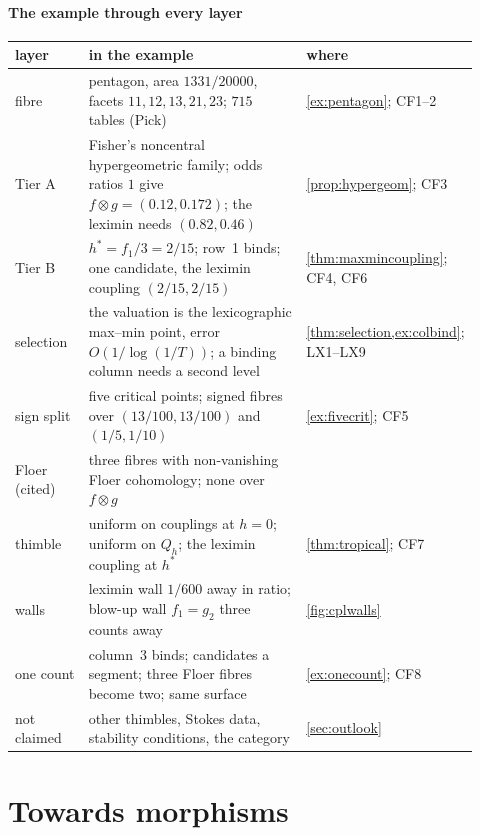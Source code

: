 \documentclass[11pt]{article}
\theoremstyle{definition}\newtheorem{definition}[theorem]{Definition}\newtheorem{remark}[theorem]{Remark}\newtheorem{example}[theorem]{Example}\newtheorem{problem}[theorem]{Open problem}\crefname{problem}{Problem}{Problems}
\begin{document}
\subsection{The example through every layer}

\begin{center}\small
\begin{tabular}{>{\raggedright\arraybackslash}p{0.17\linewidth}>{\raggedright\arraybackslash}p{0.58\linewidth}>{\raggedright\arraybackslash}p{0.17\linewidth}}\toprule
layer & in the example & where\\\midrule
fibre & pentagon, area $1331/20000$, facets $11,12,13,21,23$; $715$ tables (Pick) & \cref{ex:pentagon}; CF1--2\\
Tier A & Fisher's noncentral hypergeometric family; odds ratios $1$ give $f\otimes g=(0.12,0.172)$; the leximin needs $(0.82,0.46)$ & \cref{prop:hypergeom}; CF3\\
Tier B & $h^*=f_1/3=2/15$; row~1 binds; one candidate, the leximin coupling $(2/15,2/15)$ & \cref{thm:maxmincoupling}; CF4, CF6\\
selection & the valuation is the lexicographic max--min point, error $O(1/\log(1/T))$; a binding column needs a second level & \cref{thm:selection,ex:colbind}; LX1--LX9\\
sign split & five critical points; signed fibres over $(13/100,13/100)$ and $(1/5,1/10)$ & \cref{ex:fivecrit}; CF5\\
Floer (cited) & three fibres with non-vanishing Floer cohomology; none over $f\otimes g$ & \cite{ChoOh2006,Awasthi2026Br}\\
thimble & uniform on couplings at $h=0$; uniform on $Q_h$; the leximin coupling at $h^*$ & \cref{thm:tropical}; CF7\\
walls & leximin wall $1/600$ away in ratio; blow-up wall $f_1=g_2$ three counts away & \cref{fig:cplwalls}\\
one count & column~3 binds; candidates a segment; three Floer fibres become two; same surface & \cref{ex:onecount}; CF8\\
not claimed & other thimbles, Stokes data, stability conditions, the category & \cref{sec:outlook}\\\bottomrule
\end{tabular}
\end{center}

\part{Towards morphisms}
\end{document}

